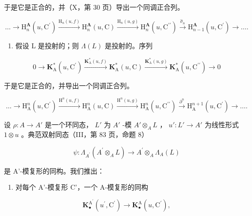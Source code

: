 于是它是正合的，并（X，第 30 页）导出一个同调正合列。

\[
\dots \to \mathrm{H} _ {n} ^ {\mathbf {A}} (u, \mathrm{C} ^ {\prime}) \xrightarrow {\mathrm{H} _ {n} (u , f)} \mathrm{H} _ {n} ^ {\mathbf {A}} (u, \mathrm{C}) \xrightarrow {\mathrm{H} _ {n} (u , g)} \mathrm{H} _ {n} ^ {\mathbf {A}} (u, \mathrm{C} ^ {\prime \prime}) \xrightarrow {\hat {\sigma} _ {n}} \mathrm{H} _ {n - 1} ^ {\mathbf {A}} (u, \mathrm{C} ^ {\prime}) \to \dots .
\]

\begin{enumerate}
\def\labelenumi{\alph{enumi})}
\setcounter{enumi}{1}
\tightlist
\item
  假设 L 是投射的；则 \(\Lambda(L)\) 是投射的。序列
\end{enumerate}

\[
0 \rightarrow \mathbf {K} _ {\mathrm{A}} ^ {*} (u, \mathrm{C} ^ {\prime}) \xrightarrow {\mathbf {K} _ {\mathrm{A}} ^ {*} (u , f)} \mathbf {K} _ {\mathrm{A}} ^ {*} (u, \mathrm{C}) \xrightarrow {\mathbf {K} _ {\mathrm{A}} ^ {*} (u , g)} \mathbf {K} _ {\mathrm{A}} ^ {*} (u, \mathrm{C} ^ {\prime \prime}) \rightarrow 0
\]

于是它是正合的，并导出一个同调正合列。

\[
\dots \rightarrow \mathrm{H} _ {\mathrm{A}} ^ {n} (u, \mathrm{C} ^ {\prime}) \xrightarrow {\mathrm{H} ^ {n} (u , f)} \mathrm{H} _ {\mathrm{A}} ^ {n} (u, \mathrm{C}) \xrightarrow {\mathrm{H} ^ {n} (u , g)} \mathrm{H} _ {\mathrm{A}} ^ {n} (u, \mathrm{C} ^ {\prime \prime}) \xrightarrow {\partial^ {n}} \mathrm{H} _ {\mathrm{A}} ^ {n + 1} (u, \mathrm{C} ^ {\prime}) \rightarrow \dots .
\]

设 \(\rho: A \to A'\) 是一个环同态， \(L'\) 为 \(A'\) -模 \(A' \otimes_A L\) ， \(u': L' \to A'\) 为线性形式 \(1 \otimes u\) 。典范双射同态（III，第 83 页，命题 8）

\[
\psi : \Lambda_ {A ^ {\prime}} (A ^ {\prime} \otimes_ {A} L) \rightarrow A ^ {\prime} \otimes_ {A} \Lambda_ {A} (L)
\]

是 A'-模复形的同构。我们推出：

\begin{enumerate}
\def\labelenumi{\arabic{enumi})}
\tightlist
\item
  对每个 A'-模复形 C'，一个 A-模复形的同构
\end{enumerate}

\[
\mathbf {K} _ {\bullet} ^ {\mathrm{A} ^ {\prime}} \left(u ^ {\prime}, \mathrm{C} ^ {\prime}\right)\rightarrow \mathbf {K} _ {\bullet} ^ {\mathrm{A}} \left(u, \mathrm{C} ^ {\prime}\right),
\]

